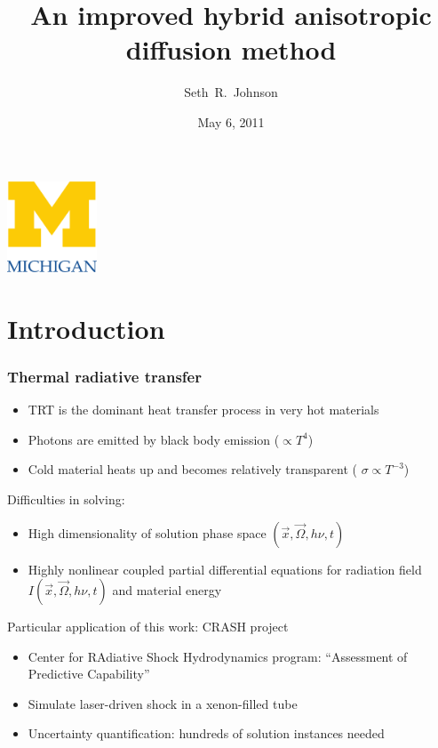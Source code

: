 \documentclass[draft]{beamer}
\title[ORNL Seminar]%
{An improved hybrid anisotropic diffusion method}
\author[SRJ]{Seth~R.~Johnson}
\institute[UMich]{
University of Michigan, Ann Arbor
}
\date[5/6/2011]{May 6, 2011}
\begin{document}

\begin{frame}
\titlepage
\begin{center}
  \includegraphics[width=0.2\textwidth]{../figures/umlogo}
\end{center}
\end{frame}

\section{Introduction}
\begin{frame}
  \frametitle{Thermal radiative transfer}
  \begin{itemize}
    \item TRT is the dominant heat transfer process in very hot materials
    \item Photons are emitted by black body emission ($\propto T^4$)
    \item Cold material heats up and becomes relatively transparent (
      $\sigma\propto T^{-3}$)
  \end{itemize}

  Difficulties in solving:
  \begin{itemize}
    \item High dimensionality of solution phase space $(\vec{x}, \vec{\Omega},
      h\nu, t)$
    \item Highly nonlinear coupled partial differential equations for radiation
      field $I(\vec{x}, \vec{\Omega}, h\nu, t)$ and material energy
  \end{itemize}

  Particular application of this work: CRASH project
  \begin{itemize}
    \item Center for RAdiative Shock Hydrodynamics program: ``Assessment
      of Predictive Capability''
    \item Simulate laser-driven shock in a xenon-filled tube
    \item Uncertainty quantification: hundreds of solution instances needed
  \end{itemize}
\end{frame}
\end{document}
